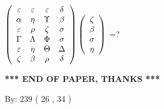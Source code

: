 \documentclass[12pt]{article}
\begin{document}
 
$  %
 \left( \begin{array}
 {
 c
 c
 c
 c
 }
 \varepsilon & 
 \varepsilon & 
 \varepsilon & 
 \delta \\ 
 \alpha & 
 \eta & 
 \Upsilon & 
 \beta \\ 
 \varepsilon & 
 \rho & 
                    \zeta & 
 \sigma \\ 
 \Gamma & 
 \Lambda & 
 \Phi & 
 \sigma \\ 
 \varepsilon & 
 \eta & 
 \Theta & 
 \Delta \\ 
                    \zeta & 
 \beta & 
 \rho & 
 \delta
 \end{array} \right)
 \left( \begin{array}
 {
 c
 }
                    \zeta \\ 
 \beta \\ 
 \sigma \\ 
 \eta
 \end{array} \right)
$ =?
 

 

 
\vspace{0.3in}
   
   
 \vspace{0.2in}
 
   
   
   
   
\vspace{1.0in} 
{\textbf{\large{ *** END OF PAPER, THANKS *** }}} 
   
   
\hspace{1.0in} By: 
         239 (          26 ,           34 )
   
   
 
 
\end{document}
